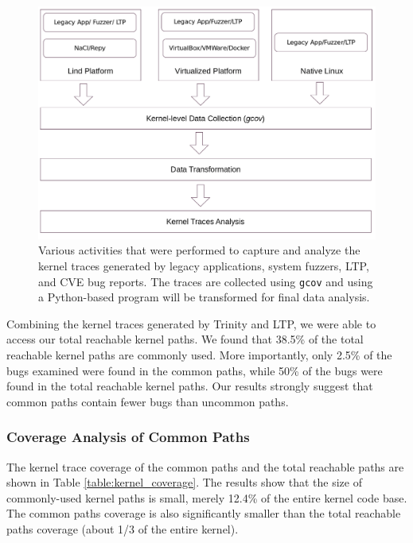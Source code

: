 \begin{figure}%
\centering
\includegraphics[width=1.0\columnwidth]{diagram/data_collection.png}
\caption{Various activities that were performed to capture and analyze the kernel traces generated by legacy applications, system fuzzers, LTP, and CVE bug reports. The traces are collected using \texttt{gcov} and using a Python-based program will be transformed for final data analysis.} 
\label{fig:design}
\end{figure}


Combining the kernel traces generated by Trinity and LTP, we were able to
access our total reachable kernel paths.
We found that 38.5\% of the total reachable
kernel paths are commonly used. 
More importantly, only 2.5\% of the bugs examined were found in the common
paths, 
while 50\% of the bugs were found in the total reachable kernel paths. 
Our results strongly suggest that common paths contain fewer bugs than uncommon
paths.  

\subsubsection{Coverage Analysis of Common Paths}

The kernel trace coverage of the common paths and the total reachable paths
are shown in Table \ref{table:kernel_coverage}. 
The results show that the size of commonly-used kernel paths is small,
merely 12.4\% of the entire kernel code base. 
The common paths coverage is also significantly smaller than the total
reachable paths coverage 
(about 1/3 of the entire kernel).

